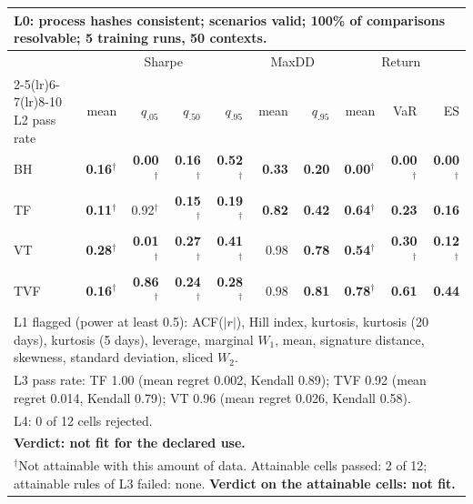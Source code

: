 \begin{tabular}{lrrrrrrrrr}
\toprule
\multicolumn{10}{p{13.5cm}}{L0: process hashes consistent; scenarios valid; 100\% of comparisons resolvable; 5 training runs, 50 contexts.} \\
\midrule
 & \multicolumn{4}{c}{Sharpe} & \multicolumn{2}{c}{MaxDD} & \multicolumn{3}{c}{Return} \\
\cmidrule(lr){2-5}\cmidrule(lr){6-7}\cmidrule(lr){8-10}
L2 pass rate & mean & $q_{.05}$ & $q_{.50}$ & $q_{.95}$ & mean & $q_{.95}$ & mean & VaR & ES \\
\midrule
BH & \textbf{0.16}$^{\dagger}$ & \textbf{0.00}$^{\dagger}$ & \textbf{0.16}$^{\dagger}$ & \textbf{0.52}$^{\dagger}$ & \textbf{0.33} & \textbf{0.20} & \textbf{0.00}$^{\dagger}$ & \textbf{0.00}$^{\dagger}$ & \textbf{0.00}$^{\dagger}$ \\
TF & \textbf{0.11}$^{\dagger}$ & 0.92$^{\dagger}$ & \textbf{0.15}$^{\dagger}$ & \textbf{0.19}$^{\dagger}$ & \textbf{0.82} & \textbf{0.42} & \textbf{0.64}$^{\dagger}$ & \textbf{0.23} & \textbf{0.16} \\
VT & \textbf{0.28}$^{\dagger}$ & \textbf{0.01}$^{\dagger}$ & \textbf{0.27}$^{\dagger}$ & \textbf{0.41}$^{\dagger}$ & 0.98 & \textbf{0.78} & \textbf{0.54}$^{\dagger}$ & \textbf{0.30}$^{\dagger}$ & \textbf{0.12}$^{\dagger}$ \\
TVF & \textbf{0.16}$^{\dagger}$ & \textbf{0.86}$^{\dagger}$ & \textbf{0.24}$^{\dagger}$ & \textbf{0.28}$^{\dagger}$ & 0.98 & \textbf{0.81} & \textbf{0.78}$^{\dagger}$ & \textbf{0.61} & \textbf{0.44} \\
\midrule
\multicolumn{10}{p{13.5cm}}{L1 flagged (power at least 0.5): ACF($|r|$), Hill index, kurtosis, kurtosis (20 days), kurtosis (5 days), leverage, marginal $W_1$, mean, signature distance, skewness, standard deviation, sliced $W_2$.} \\
\multicolumn{10}{p{13.5cm}}{L3 pass rate: TF 1.00 (mean regret 0.002, Kendall 0.89); TVF 0.92 (mean regret 0.014, Kendall 0.79); VT 0.96 (mean regret 0.026, Kendall 0.58).} \\
\multicolumn{10}{p{13.5cm}}{L4: 0 of 12 cells rejected.} \\
\multicolumn{10}{p{13.5cm}}{\textbf{Verdict: not fit for the declared use.}} \\
\multicolumn{10}{p{13.5cm}}{$^{\dagger}$Not attainable with this amount of data. Attainable cells passed: 2 of 12; attainable rules of L3 failed: none. \textbf{Verdict on the attainable cells: not fit.}} \\
\bottomrule
\end{tabular}
